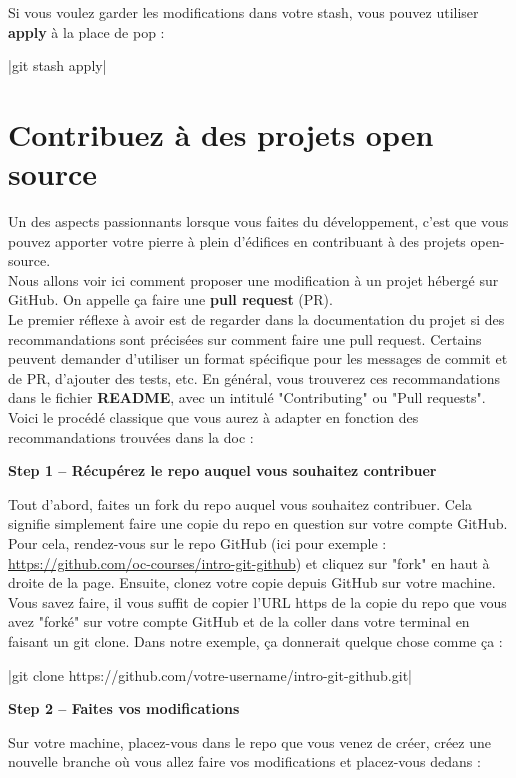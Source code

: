 Si vous voulez garder les modifications dans votre stash, vous pouvez utiliser \textbf{apply} à la place de pop : 

|git stash apply|

\section{Contribuez à des projets open source}
Un des aspects passionnants lorsque vous faites du développement, c'est que vous pouvez apporter votre pierre à plein d'édifices en contribuant à des projets open-source. \\

Nous allons voir ici comment proposer une modification à un projet hébergé sur GitHub. 
On appelle ça faire une \textbf{pull request} (PR).\\

Le premier réflexe à avoir est de regarder dans la documentation du projet si des recommandations sont précisées sur comment faire une pull request. Certains peuvent demander d'utiliser un format spécifique pour les messages de commit et de PR, d'ajouter des tests, etc. En général, vous trouverez ces recommandations dans le fichier \textbf{README}, avec un intitulé "Contributing" ou "Pull requests". \\

Voici le procédé classique que vous aurez à adapter en fonction des recommandations trouvées dans la doc : 

\textbf{Step 1 – Récupérez le repo auquel vous souhaitez contribuer
}\

Tout d'abord, faites un fork du repo auquel vous souhaitez contribuer.
Cela signifie simplement faire une copie du repo en question sur votre compte GitHub. Pour cela, rendez-vous sur le repo GitHub (ici pour exemple : \url{https://github.com/oc-courses/intro-git-github}) et cliquez sur "fork" en haut à droite de la page. Ensuite, clonez votre copie depuis GitHub sur votre machine. Vous savez faire, il vous suffit de copier l'URL https de la copie du repo que vous avez "forké" sur votre compte GitHub et de la coller dans votre terminal en faisant un git clone. Dans notre exemple, ça donnerait quelque chose comme ça : 

|git clone https://github.com/votre-username/intro-git-github.git|

\textbf{Step 2 – Faites vos modifications
} \

Sur votre machine, placez-vous dans le repo que vous venez de créer, créez une nouvelle branche où vous allez faire vos modifications et placez-vous dedans :

